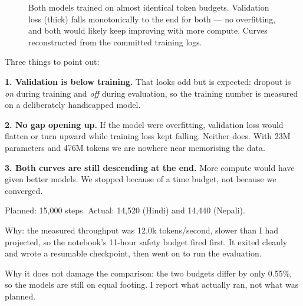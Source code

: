 \documentclass[11pt]{report}
\begin{document}
\begin{figure}[htbp]
\caption{Both models trained on almost identical token budgets. Validation loss
(thick) falls monotonically to the end for both --- no overfitting, and both would
likely keep improving with more compute. Curves reconstructed from the committed
training logs.}
\label{fig:loss}
\end{figure}

\begin{notebox}
Three things to point out:

\textbf{1. Validation is below training.} That looks odd but is expected: dropout
is \emph{on} during training and \emph{off} during evaluation, so the training
number is measured on a deliberately handicapped model.

\textbf{2. No gap opening up.} If the model were overfitting, validation loss
would flatten or turn upward while training loss kept falling. Neither does. With
23M parameters and 476M tokens we are nowhere near memorising the data.

\textbf{3. Both curves are still descending at the end.} More compute would have
given better models. We stopped because of a time budget, not because we
converged.
\end{notebox}

\begin{warnbox}
Planned: 15,000 steps. Actual: 14,520 (Hindi) and 14,440 (Nepali).

Why: the measured throughput was 12.0k tokens/second, slower than I had projected,
so the notebook's 11-hour safety budget fired first. It exited cleanly and wrote a
resumable checkpoint, then went on to run the evaluation.

Why it does not damage the comparison: the two budgets differ by only 0.55\%, so
the models are still on equal footing. I report what actually ran, not what was
planned.
\end{warnbox}
\end{document}
